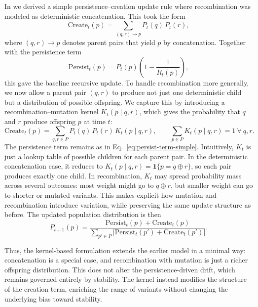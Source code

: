 \documentclass[life,article,submit,pdftex,moreauthors]{Definitions/mdpi}
\begin{document}
In \cite{adler_sda} we derived a simple persistence–creation update rule where 
recombination was modeled as deterministic concatenation. This took the form
\begin{equation}
\label{eq:create-term-simple}
\mathrm{Create}_t(p) = \sum_{(q,r)\to p} P_t(q)\,P_t(r),
\end{equation}
where $(q,r)\to p$ denotes parent pairs that yield $p$ by concatenation. 
Together with the persistence term
\begin{equation}
\label{eq:persist-term-simple}
\mathrm{Persist}_t(p) = P_t(p)\left(1-\frac{1}{\overline{R}_t(p)}\right),
\end{equation}
this gave the baseline recursive update. To handle recombination more generally, we now allow a parent pair $(q,r)$ 
to produce not just one deterministic child but a distribution of possible 
offspring. We capture this by introducing a recombination–mutation kernel 
$K_t(p\mid q,r)$, which gives the probability that $q$ and $r$ produce 
offspring $p$ at time $t$:
\begin{equation}
\label{eq:create-term-kernel}
\mathrm{Create}_t(p) = \sum_{q,r\in P} P_t(q)\,P_t(r)\,K_t(p\mid q,r),
\qquad \sum_{p\in P} K_t(p\mid q,r)=1~\forall~q,r.
\end{equation}
The persistence term remains as in Eq.~\ref{eq:persist-term-simple}. Intuitively, $K_t$ is just a lookup table of possible children for each 
parent pair. In the deterministic concatenation case, it reduces to 
$K_t(p\mid q,r)=\mathbf{1}\{p=q\oplus r\}$, so each pair produces exactly 
one child. In recombination, $K_t$ may spread probability mass across 
several outcomes: most weight might go to $q\oplus r$, but smaller weight 
can go to shorter or mutated variants. This makes explicit how mutation 
and recombination introduce variation, while preserving the same update 
structure as before. The updated population distribution is then
\begin{equation}
\label{eq:full-ba-update}
P_{t+1}(p) = \frac{\mathrm{Persist}_t(p) + \mathrm{Create}_t(p)}
{\sum_{p' \in P} \big[\mathrm{Persist}_t(p') + \mathrm{Create}_t(p')\big]}.
\end{equation}

Thus, the kernel-based formulation extends the earlier model in a minimal
way: concatenation is a special case, and recombination with mutation is
just a richer offspring distribution. This does not alter the persistence-driven drift, which remains governed entirely by stability. The kernel instead modifies the structure of the creation term, enriching the range of variants without changing the underlying bias toward stability.
\end{document}
